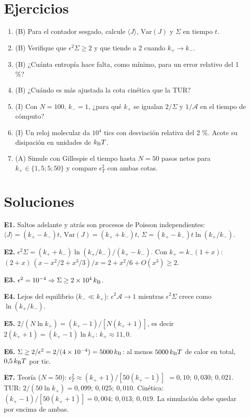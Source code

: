 \documentclass[11pt,a4paper]{article}
\begin{document}
\section{Ejercicios}
\begin{enumerate}[label=\textbf{E\arabic*.}]
\item (B) Para el contador sesgado, calcule $\langle J\rangle$, $\mathrm{Var}(J)$ y $\Sigma$ en tiempo $t$.
\item (B) Verifique que $\epsilon^2\Sigma\ge2$ y que tiende a 2 cuando $k_+\to k_-$.
\item (B) ¿Cuánta entropía hace falta, como mínimo, para un error relativo del 1 \%?
\item (B) ¿Cuándo es más ajustada la cota cinética que la TUR?
\item (I) Con $N=100$, $k_-=1$, ¿para qué $k_+$ se igualan $2/\Sigma$ y $1/\mathcal A$ en el tiempo de cómputo?
\item (I) Un reloj molecular da $10^4$ tics con desviación relativa del 2 \%. Acote su disipación en unidades de $k_{\mathrm B} T$.
\item (A) Simule con Gillespie el tiempo hasta $N=50$ pasos netos para $k_+\in\{1{,}5;5;50\}$ y compare $\epsilon_T^2$ con ambas cotas.
\end{enumerate}
\section{Soluciones}
\begin{solucion}
\textbf{E1.} Saltos adelante y atrás son procesos de Poisson independientes: $\langle J\rangle=(k_+-k_-)t$, $\mathrm{Var}(J)=(k_++k_-)t$,
$\Sigma=(k_+-k_-)t\ln(k_+/k_-)$.

\textbf{E2.} $\epsilon^2\Sigma=(k_++k_-)\ln(k_+/k_-)/(k_+-k_-)$. Con $k_+=k_-(1+x)$: $(2+x)\,(x-x^2/2+x^3/3)/x=2+x^2/6+O(x^3)\ge2$.

\textbf{E3.} $\epsilon^2=10^{-4}\Rightarrow\Sigma\ge2\times10^4\,k_{\mathrm B}$.

\textbf{E4.} Lejos del equilibrio ($k_-\ll k_+$): $\epsilon^2\mathcal A\to1$ mientras $\epsilon^2\Sigma$ crece como $\ln(k_+/k_-)$.

\textbf{E5.} $2/(N\ln k_+)=(k_+-1)/[N(k_++1)]$, es decir $2(k_++1)=(k_+-1)\ln k_+$: $k_+\approx 11{,}0$.

\textbf{E6.} $\Sigma\ge2/\epsilon^2=2/(4\times10^{-4})=5000\,k_{\mathrm B}$: al menos $5000\,k_{\mathrm B} T$ de calor en total, $0{,}5\,k_{\mathrm B} T$ por tic.

\textbf{E7.} Teoría ($N=50$): $\epsilon_T^2\approx(k_++1)/[50(k_+-1)]$ $=0{,}10;\ 0{,}030;\ 0{,}021$. TUR: $2/(50\ln k_+)=0{,}099;\ 0{,}025;\ 0{,}010$.
Cinética: $(k_+-1)/[50(k_++1)]=0{,}004;\ 0{,}013;\ 0{,}019$. La simulación debe quedar por encima de ambas.
\end{solucion}
\end{document}
